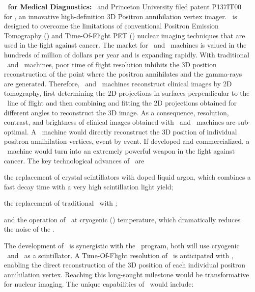\begin{asparaenum}
\item[\bf \SiPMs\ for Medical Diagnostics:] \INFN\ and Princeton University filed patent P137IT00 for \ThreeDPi, an innovative high-definition 3D Positron annihilation vertex imager.  \ThreeDPi\ is designed to overcome the limitations of conventional Positron Emission Tomography (\PET) and Time-Of-Flight PET (\TOFPET) nuclear imaging techniques that are used in the fight against cancer. The market for \PET\ and \TOFPET\ machines is valued in the hundreds of million of dollars per year and is expanding rapidly.  With traditional \PET\ and \TOFPET\ machines, poor time of flight resolution inhibits the 3D position reconstruction of the point where the positron annihilates and the gamma-rays are generated. Therefore, \PET\ and \TOFPET\ machines reconstruct clinical images by 2D tomography, first determining the 2D projections in surfaces perpendicular to the \grs\ line of flight and then combining and fitting the 2D projections obtained for different angles to reconstruct the 3D image.  As a consequence, resolution, contrast, and brightness of clinical images obtained with \PET\ and \TOFPET\ machines are sub-optimal.  A \ThreeDPi\ machine would directly reconstruct the 3D position of individual positron annihilation vertices, event by event. If developed and commercialized, a \ThreeDPi\ machine would turn into an extremely powerful weapon in the fight against cancer.  The key technological advances of \ThreeDPi\ are
\begin{inparaenum}
\item the replacement of crystal scintillators with doped liquid argon, which combines a fast decay time with a very high scintillation light yield;
\item the replacement of traditional \PMTs\ with \SiPMs;
\item and the operation of \SiPMs\ at cryogenic (\LArNormalTemperature) temperature, which dramatically reduces the noise of the \SiPMs.
\end{inparaenum}
The development of \ThreeDPi\ is synergistic with the \DS\ program, both will use cryogenic \SiPMs\ and \LAr\ as a scintillator. A Time-Of-Flight resolution of \ThreeDPiTimeResolution\ is anticipated with \ThreeDPi, enabling the direct reconstruction of the 3D position of each individual positron annihilation vertex. Reaching this long-sought milestone would be transformative for nuclear imaging. The unique capabilities of \ThreeDPi\ would include:
\begin{compactenum}

\end{compactenum}
\end{asparaenum}
